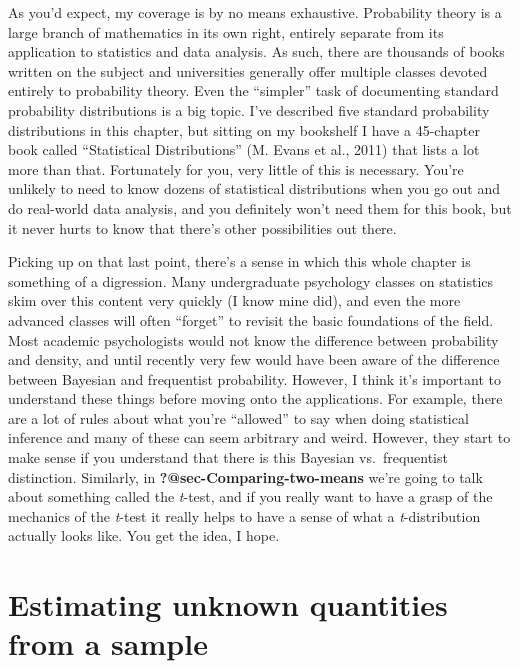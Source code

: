 \documentclass[
  a4paper,
]{book}
\begin{document}
As you'd expect, my coverage is by no means exhaustive. Probability
theory is a large branch of mathematics in its own right, entirely
separate from its application to statistics and data analysis. As such,
there are thousands of books written on the subject and universities
generally offer multiple classes devoted entirely to probability theory.
Even the ``simpler'' task of documenting standard probability
distributions is a big topic. I've described five standard probability
distributions in this chapter, but sitting on my bookshelf I have a
45-chapter book called ``Statistical Distributions'' (M. Evans et al.,
2011) that lists a lot more than that. Fortunately for you, very little
of this is necessary. You're unlikely to need to know dozens of
statistical distributions when you go out and do real-world data
analysis, and you definitely won't need them for this book, but it never
hurts to know that there's other possibilities out there.

Picking up on that last point, there's a sense in which this whole
chapter is something of a digression. Many undergraduate psychology
classes on statistics skim over this content very quickly (I know mine
did), and even the more advanced classes will often ``forget'' to
revisit the basic foundations of the field. Most academic psychologists
would not know the difference between probability and density, and until
recently very few would have been aware of the difference between
Bayesian and frequentist probability. However, I think it's important to
understand these things before moving onto the applications. For
example, there are a lot of rules about what you're ``allowed'' to say
when doing statistical inference and many of these can seem arbitrary
and weird. However, they start to make sense if you understand that
there is this Bayesian vs.~frequentist distinction. Similarly, in
\textbf{?@sec-Comparing-two-means} we're going to talk about something
called the \emph{t}-test, and if you really want to have a grasp of the
mechanics of the \emph{t}-test it really helps to have a sense of what a
\emph{t}-distribution actually looks like. You get the idea, I hope.

\hypertarget{sec-Estimating-unknown-quantities-from-a-sample}{%
\chapter{Estimating unknown quantities from a
sample}\label{sec-Estimating-unknown-quantities-from-a-sample}}
\end{document}
